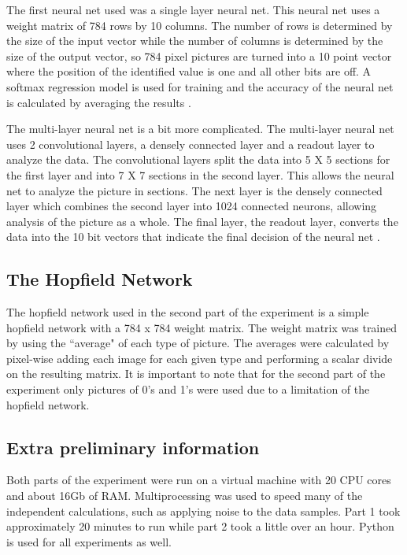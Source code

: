 \documentclass{IEEEtran}
\begin{document}
			The first neural net used was a single layer neural net. This neural net uses a weight matrix of 784 rows by 10 columns. The number of rows is determined by the size of the input vector while the number of columns is determined by the size of the output vector, so 784 pixel pictures are turned into a 10 point vector where the position of the identified value is one and all other bits are off. A softmax regression model is used for training and the accuracy of the neural net is calculated by averaging the results \cite{Tensor1}.
			
			The multi-layer neural net is a bit more complicated. The multi-layer neural net uses 2 convolutional layers, a densely connected layer and a readout layer to analyze the data. The convolutional layers split the data into 5 X 5 sections for the first layer and into 7 X 7 sections in the second layer. This allows the neural net to analyze the picture in sections. The next layer is the densely connected layer which combines the second layer into 1024 connected neurons, allowing analysis of the picture as a whole. The final layer, the readout layer, converts the data into the 10 bit vectors that indicate the final decision of the neural net \cite{Tensor2}. 
		
		\subsection{The Hopfield Network}
			The hopfield network used in the second part of the experiment is a simple hopfield network with a 784 x 784 weight matrix. The weight matrix was trained by using the ``average" of each type of picture. The averages were calculated by pixel-wise adding each image for each given type and performing a scalar divide on the resulting matrix. It is important to note that for the second part of the experiment only pictures of 0's and 1's were used due to a limitation of the hopfield network.
			
		\subsection{Extra preliminary information}
			Both parts of the experiment were run on a virtual machine with 20 CPU cores and about 16Gb of RAM. Multiprocessing was used to speed many of the independent calculations, such as applying noise to the data samples. Part 1 took approximately 20 minutes to run while part 2 took a little over an hour. Python is used for all experiments as well.
			
\end{document}
